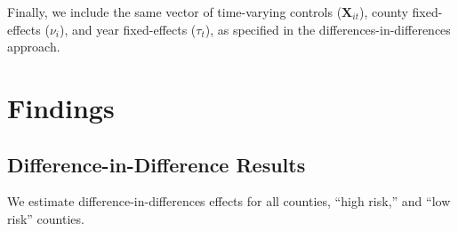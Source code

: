 \documentclass[
  11pt,
]{article}
\begin{document}
Finally, we include the same vector of time-varying controls
(\(\textbf{X}_{it}\)), county fixed-effects (\(\nu_{i}\)), and year
fixed-effects (\(\tau_{t}\)), as specified in the
differences-in-differences approach.

\medspace

\hypertarget{findings}{%
\section{Findings}\label{findings}}

\hypertarget{difference-in-difference-results}{%
\subsection{Difference-in-Difference
Results}\label{difference-in-difference-results}}

We estimate difference-in-differences effects for all counties, ``high
risk,'' and ``low risk'' counties.
\end{document}
